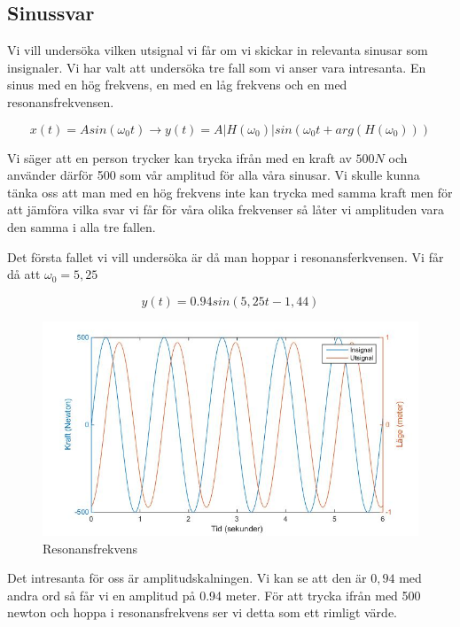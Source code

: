 \documentclass[10pt,a4paper]{article}
\begin{document}
\newpage
\subsection{Sinussvar}
Vi vill undersöka vilken utsignal vi får om vi skickar in relevanta sinusar som insignaler. Vi har valt att undersöka tre fall som vi anser vara intresanta. En sinus med en hög frekvens, en med en låg frekvens och en med resonansfrekvensen.

\begin{equation}
x(t) = A sin(\omega_0t) \rightarrow y(t) = A|H(\omega_0)|sin(\omega_0t + arg(H(\omega_0)))
\end{equation}

Vi säger att en person trycker kan trycka ifrån med en kraft av $500N$ och använder därför 500 som vår amplitud för alla våra sinusar. Vi skulle kunna tänka oss att man med en hög frekvens inte kan trycka med samma kraft men för att jämföra vilka svar vi får för våra olika frekvenser så låter vi amplituden vara den samma i alla tre fallen.

Det första fallet vi vill undersöka är då man hoppar i resonansferkvensen. Vi får då att $\omega_0 = 5,25$

\begin{equation}
y(t) = 0.94 sin(5,25 t - 1,44)
\end{equation}

\begin{figure}[h]
\begin{center}
\includegraphics[scale=0.4]{sinussvar1}
\caption{Resonansfrekvens}
\end{center}
\end{figure}

Det intresanta för oss är amplitudskalningen. Vi kan se att den är $0,94$ med andra ord så får vi en amplitud på 0.94 meter. För att trycka ifrån med 500 newton och hoppa i resonansfrekvens ser vi detta som ett rimligt värde.
\end{document}
